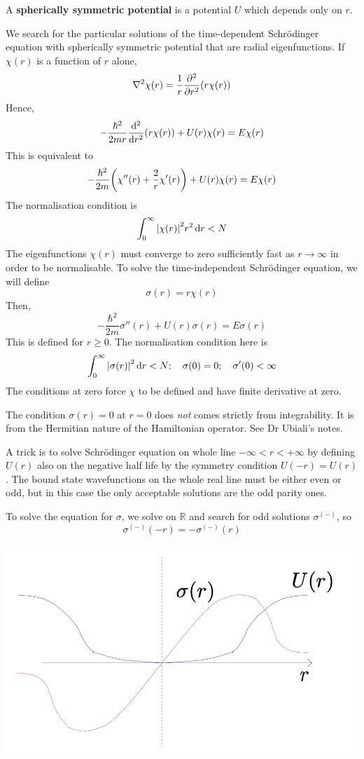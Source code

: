 \documentclass[a4paper]{article}
\begin{document}
\begin{definition}
	A \textbf{spherically symmetric potential} is a potential \( U \) which depends only on \( r \).
\end{definition}
We search for the particular solutions of the time-dependent Schr\"odinger equation with spherically symmetric potential that are radial eigenfunctions.
If \( \chi(r) \) is a function of \( r \) alone,
\[
	\laplacian{\chi(r)} = \frac{1}{r} \pdv[2]{r} \qty(r\chi(r))
\]
Hence,
\[
	-\frac{\hbar^2}{2mr} \dv[2]{r} \qty(r \chi(r)) + U(r) \chi(r) = E \chi(r)
\]
This is equivalent to
\[
	-\frac{\hbar^2}{2m} \qty( \chi''(r) + \frac{2}{r} \chi'(r) ) + U(r) \chi(r) = E \chi(r)
\]
The normalisation condition is
\[
	\int_0^\infty \abs{\chi(r)}^2 r^2 \dd{r} < N
\]
The eigenfunctions \( \chi(r) \) must converge to zero sufficiently fast as \( r \to \infty \) in order to be normalisable.
To solve the time-independent Schr\"odinger equation, we will define
\[
	\sigma(r) = r \chi(r)
\]
Then,
\[
	-\frac{\hbar^2}{2m} \sigma''(r) + U(r) \sigma(r) = E \sigma(r)
\]
This is defined for \( r \geq 0 \).
The normalisation condition here is
\[
	\int_0^\infty \abs{\sigma(r)}^2 \dd{r} < N;\quad \sigma(0) = 0;\quad \sigma'(0) < \infty
\]
The conditions at zero force \( \chi \) to be defined and have finite derivative at zero. 

\begin{note}
	The condition $\sigma(r)=0$ at $r=0$ does \textit{not} comes strictly from integrability. It is from the Hermitian nature of the Hamiltonian operator. See Dr Ubiali's notes.
\end{note}

A trick is to solve Schr\"odinger equation on whole line $-\infty<r<+\infty$ by defining $U(r)$ also on the negative half life by the symmetry condition $U(-r)=U(r)$. The bound state wavefunctions on the whole real line must be either even or odd, but in this case the only acceptable solutions are the odd parity ones. 

To solve the equation for \( \sigma \), we solve on \( \mathbb R \) and search for odd solutions \( \sigma^{(-)} \), so
\[
	\sigma^{(-)}(-r) = -\sigma^{(-)}(r)
\]

\begin{center}
	\includegraphics[scale=0.3]{qm11.png}
\end{center}
\end{document}
